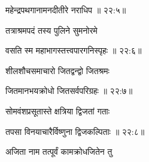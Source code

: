 
{\devanagarifont महेन्द्रपथगानामनदीतीरे नराधिप {॥ २२:५॥} \veg\dontdisplaylinenum }%

{\devanagarifont तत्राश्रमपदं तस्य पुलिने सुमनोरमे \thinspace{\dandab} \dontdisplaylinenum }%


{\devanagarifont वसति स्म महाभागस्तत्त्वपारगनिस्पृहः {॥ २२:६॥} \veg\dontdisplaylinenum }%

{\devanagarifont शीलशौचसमाचारो जितद्वन्द्वो जितश्रमः \thinspace{\dandab} \dontdisplaylinenum }%
 

{\devanagarifont जितमानभयक्रोधो जितसर्वपरिग्रहः {॥ २२:७॥} \veg\dontdisplaylinenum }%

{\devanagarifont सोमवंशप्रसूतास्ते क्षत्रिया द्विजतां गताः \thinspace{\dandab} \dontdisplaylinenum }%


{\devanagarifont तपसा विनयाचारैर्विष्णुना द्विजकल्पिताः {॥ २२:८॥} \veg\dontdisplaylinenum }%

{\devanagarifont अजिता नाम तत्पूर्वं कामक्रोधजितेन तु \thinspace{\dandab} \dontdisplaylinenum }%

